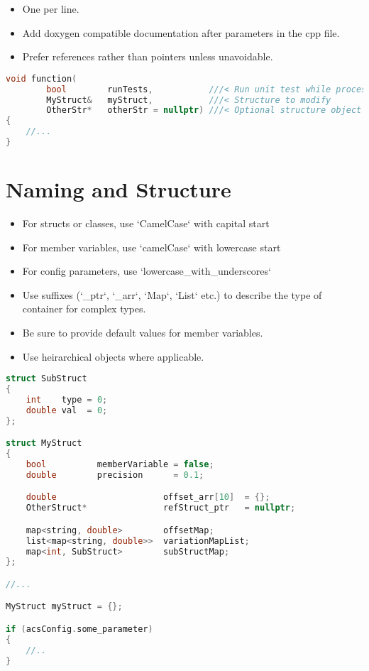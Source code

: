 \begin{itemize}
\item One per line.
\item Add doxygen compatible documentation after parameters in the cpp file.
\item Prefer references rather than pointers unless unavoidable.
\end{itemize}

\begin{lstlisting}[language=c++]
void function(
        bool        runTests,           ///< Run unit test while processing
        MyStruct&   myStruct,           ///< Structure to modify
        OtherStr*	otherStr = nullptr)	///< Optional structure object to populate (cant use reference because its optional)
{
   	//...
}
\end{lstlisting}

\section{Naming and Structure}
%
\begin{itemize}
\item For structs or classes, use `CamelCase` with capital start
\item For member variables, use `camelCase` with lowercase start
\item For config parameters, use `lowercase\_with\_underscores`
\item Use suffixes (`\_ptr`, `\_arr`, `Map`, `List` etc.) to describe the type of container for complex types.
\item Be sure to provide default values for member variables.
\item Use heirarchical objects where applicable.
\end{itemize}
%
\begin{lstlisting}[language=c++]
struct SubStruct
{
    int    type = 0;
    double val  = 0;
};

struct MyStruct
{
    bool          memberVariable = false;
    double        precision      = 0.1;

    double                     offset_arr[10]  = {};
    OtherStruct*               refStruct_ptr   = nullptr;

    map<string, double>        offsetMap; 
    list<map<string, double>>  variationMapList;
    map<int, SubStruct>        subStructMap;
};

//...

MyStruct myStruct = {};

if (acsConfig.some_parameter)
{
    //..
}
\end{lstlisting}
